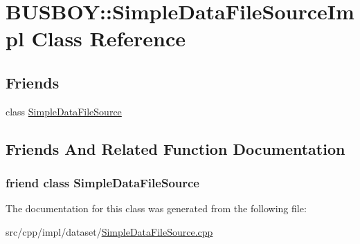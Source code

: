 \hypertarget{classBUSBOY_1_1SimpleDataFileSourceImpl}{
\section{BUSBOY::SimpleDataFileSourceImpl Class Reference}
\label{classBUSBOY_1_1SimpleDataFileSourceImpl}
}
\subsection*{Friends}
\begin{DoxyCompactItemize}
\item 
class \hyperlink{classBUSBOY_1_1SimpleDataFileSourceImpl_af1bdef7445990505d7f4767d47dba711}{SimpleDataFileSource}
\end{DoxyCompactItemize}


\subsection{Friends And Related Function Documentation}
\hypertarget{classBUSBOY_1_1SimpleDataFileSourceImpl_af1bdef7445990505d7f4767d47dba711}{
\subsubsection[{SimpleDataFileSource}]{\setlength{\rightskip}{0pt plus 5cm}friend class {\bf SimpleDataFileSource}}}
\label{classBUSBOY_1_1SimpleDataFileSourceImpl_af1bdef7445990505d7f4767d47dba711}


The documentation for this class was generated from the following file:\begin{DoxyCompactItemize}
\item 
src/cpp/impl/dataset/\hyperlink{SimpleDataFileSource_8cpp}{SimpleDataFileSource.cpp}\end{DoxyCompactItemize}
